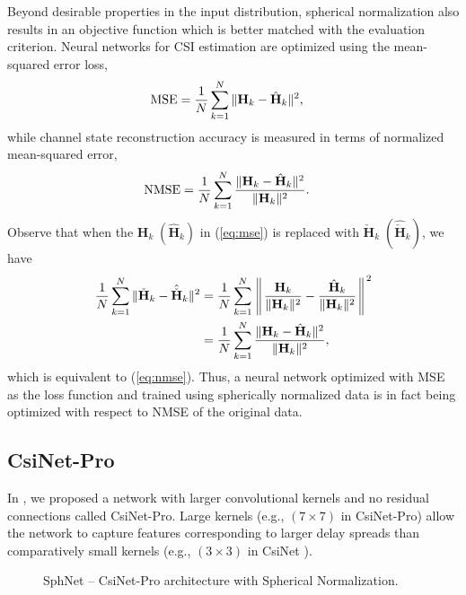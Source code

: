 Beyond desirable properties in the input distribution, spherical normalization also results in an objective function which is better matched with the evaluation criterion. Neural networks for CSI estimation are optimized using the mean-squared error loss,
\begin{align} 
	\text{MSE}&=\frac 1N \sum_{k=1}^N\Arrowvert\mathbf H_k - \hat{\mathbf H}_k\Arrowvert^2, \label{eq:mse}
\end{align}
while channel state reconstruction accuracy is measured in terms of normalized mean-squared error,
\begin{align} 
	\text{NMSE}&=\frac 1N \sum_{k=1}^N\frac{\Arrowvert\mathbf H_k - \hat{\mathbf H}_k\Arrowvert^2}{\Arrowvert\mathbf H_k\Arrowvert^2}. \label{eq:nmse}
\end{align}
Observe that when the $\mathbf H_k \; (\hat{\mathbf H}_k)$ in (\ref{eq:mse}) is replaced with $\check{\mathbf H}_k \; (\hat{\check{\mathbf H}}_k)$, we have
\begin{align*} 
	\frac 1N \sum_{k=1}^N\Arrowvert\check{\mathbf H}_k - \hat{\check{\mathbf H}}_k\Arrowvert^2&= \frac 1N \sum_{k=1}^N\left\Arrowvert \frac{\mathbf H_k}{\Arrowvert\mathbf H_k\Arrowvert^2} - \frac{\hat{\mathbf H}_k}{\Arrowvert\mathbf H_k\Arrowvert^2}\right\Arrowvert^2 \\
	&= \frac 1N \sum_{k=1}^N\frac{\Arrowvert\mathbf H_k - \hat{\mathbf H}_k\Arrowvert^2}{\Arrowvert\mathbf H_k\Arrowvert^2},
\end{align*}
which is equivalent to (\ref{eq:nmse}). Thus, a neural network optimized with MSE as the loss function and trained using spherically normalized data is in fact being optimized with respect to NMSE of the original data.

\subsection{CsiNet-Pro}
\label{sect:csinet_pro}

In \cite{ref:liu2020sphnet}, we proposed a network with larger convolutional kernels and no residual connections called CsiNet-Pro. Large kernels (e.g., $(7\times 7)$ in CsiNet-Pro) allow the network to capture features corresponding to larger delay spreads than comparatively small kernels (e.g., $(3\times 3)$ in CsiNet \cite{ref:csinet}).
\begin{figure}[htb]
  \centering
  {
    \fontsize{1pt}{1pt}
    \def\svgwidth{1.0\columnwidth}
    
  }
  \caption{SphNet -- CsiNet-Pro architecture with Spherical Normalization.}
  \label{fig:sphnet-arch}
\end{figure}

